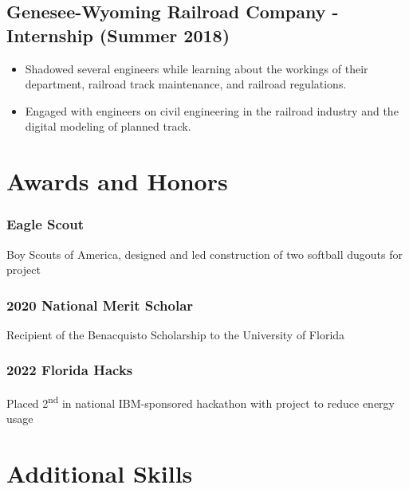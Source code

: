 \documentclass{article}
\newcommand{\sectionspacing}{\vspace{-.4em}} %
\newenvironment{CustomItemize}
{ \begin{itemize}[leftmargin=1em]
    \setlength{\itemsep}{0pt}
    \setlength{\parskip}{0pt}
    \setlength{\parindent}{0pt}
    \setlength{\parsep}{0pt}     }
{ \end{itemize}                  }
\begin{document}
\subsection{Genesee-Wyoming Railroad Company - Internship (Summer 2018)}
\begin{CustomItemize}
\item Shadowed several engineers while learning about the workings of their department, railroad track maintenance, and railroad regulations.
\item Engaged with engineers on civil engineering in the railroad industry and the digital modeling of planned track.
\end{CustomItemize}



\sectionspacing{}
\section{Awards and Honors}

\subsubsection{Eagle Scout}
Boy Scouts of America,
designed and led construction of two softball dugouts for project

\subsubsection{2020 National Merit Scholar}
Recipient of the Benacquisto Scholarship to the University of Florida

\subsubsection{2022 Florida Hacks}
Placed 2\textsuperscript{nd} in national IBM-sponsored hackathon with project to reduce energy usage


\sectionspacing{}
\section{Additional Skills}
\end{document}

